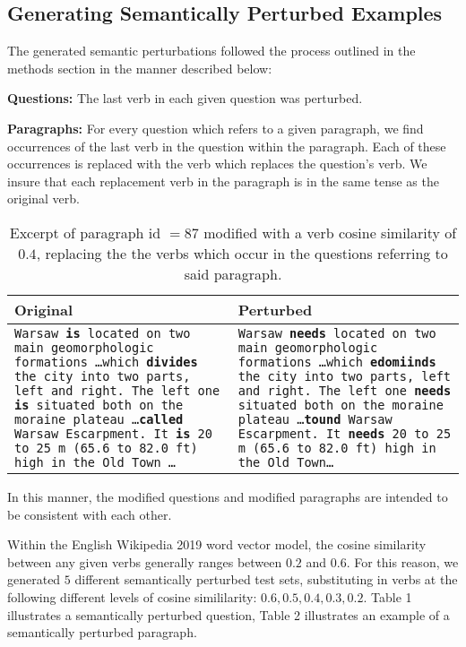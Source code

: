 \documentclass[11pt,a4paper]{article}
\begin{document}
\subsection{Generating Semantically Perturbed Examples}



 The generated semantic perturbations followed the process outlined in the methods section in the manner described below:

 \textbf{Questions:} The last verb in each given question was perturbed.
 
 \textbf{Paragraphs:} For every question which refers to a given paragraph, we find occurrences of the last verb in the question within the paragraph. Each of these occurrences is replaced with the verb which replaces the question's verb. We insure that each replacement verb in the paragraph is in the same tense as the original verb.

\begin{table}[h]
\centering
\small

\begin{tabular}{|p{3.5cm}|p{3.5cm}|}
\hline
\textbf{Original} & \textbf{Perturbed}\\\hline
\texttt{Warsaw \textbf{is} located on two main geomorphologic formations \ldots which \textbf{divides} the city into two parts, left and right. The left one  \textbf{is}  situated both on the moraine plateau \ldots \textbf{called} Warsaw Escarpment. It  \textbf{is}  20 to 25 m (65.6 to 82.0 ft) high in the Old Town \ldots} & \texttt{Warsaw \textbf{needs} located on two main geomorphologic formations \ldots which \textbf{edomiinds} the city into two parts, left and right. The left one  \textbf{needs} situated both on the moraine plateau \ldots \textbf{tound} Warsaw Escarpment. It  \textbf{needs} 20 to 25 m (65.6 to 82.0 ft) high in the Old Town\ldots}\\\hline
\end{tabular}

\caption{Excerpt of paragraph id $=87$ modified with a verb cosine similarity of $0.4$, replacing the the verbs which occur in the questions referring to said paragraph.}\label{tab:accents}
\end{table}

In this manner, the modified questions and modified paragraphs are intended to be consistent with each other. 

Within the English Wikipedia 2019 word vector model, the cosine similarity between any given verbs generally ranges between $0.2$ and $0.6$. For this reason, we generated $5$ different semantically perturbed test sets, substituting in verbs at the following different levels of cosine simililarity: $0.6,0.5,0.4,0.3,0.2$. Table 1 illustrates a semantically perturbed question, Table 2 illustrates an example of a semantically perturbed paragraph.
\end{document}
